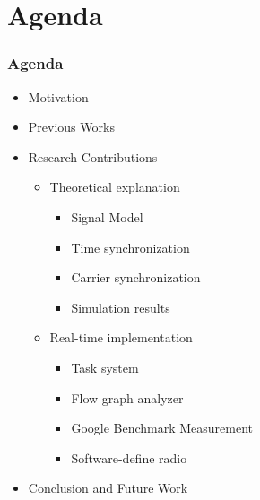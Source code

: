 \section{Agenda}

\begin{frame}
  \frametitle{Agenda}
    \begin{itemize}
        \item{Motivation}
        \item{Previous Works}
        \item{Research Contributions} 
        \begin{itemize}
            \item Theoretical explanation
                \begin{itemize}
                \item Signal Model
                \item Time synchronization
                \item Carrier synchronization
                \item Simulation results
                \end{itemize}
            \item Real-time implementation
                \begin{itemize}
                \item Task system
                \item Flow graph analyzer
                \item Google Benchmark Measurement
                \item Software-define radio
                \end{itemize}
        \end{itemize}
        \item{Conclusion and Future Work}
    \end{itemize}
\end{frame}